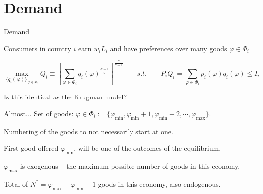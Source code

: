 \documentclass[notes,11pt, aspectratio=169, xcolor=table]{beamer}
\newenvironment{wideitemize}{\itemize\addtolength{\itemsep}{10pt}}{\enditemize}
\begin{document}
\section{Demand}

\begin{frame}{Demand}
    \begin{wideitemize}
        \item Consumers in country $i$ earn $w_iL_i$ and have preferences over many goods $\varphi \in \Phi_i$ 

        \begin{equation*}
            \max_{\{q_i(\
        \varphi)\}_{\
        \varphi \in \Phi_i}} Q_i \equiv \left[ \sum_{\varphi \in \Phi_i } q_i(
        \varphi)^{\tfrac{\sigma-1}{\sigma}} \right]^{\tfrac{\sigma}{\sigma-1} } \qquad s.t. \qquad  P_i Q_i =\sum_{\varphi \in \Phi_i } p_i(\varphi) q_i(\varphi) \le I_i
        \end{equation*}

        \item Is this identical as the Krugman model?

        \item<2-> Almost... Set of goods: $\varphi \in \Phi_i:=\{\varphi_{\min}, \varphi_{\min}+1, \varphi_{\min}+2, \cdots, \varphi_{\max}\}$.
        
        \item<2-> Numbering of the goods to not necessarily start at one.
        
        \item<3-> First good offered $\varphi_{\min}$, will be one of the outcomes of the equilibrium. 
        
        \item<4-> $\varphi_{\max}$ is exogenous -- the maximum possible number of goods in this economy.
        
        \item<5-> Total of $N^*=\varphi_{\max}-\varphi_{\min}+1$ goods in this economy, also endogenous. 

    \end{wideitemize}    
\end{frame}
\end{document}
